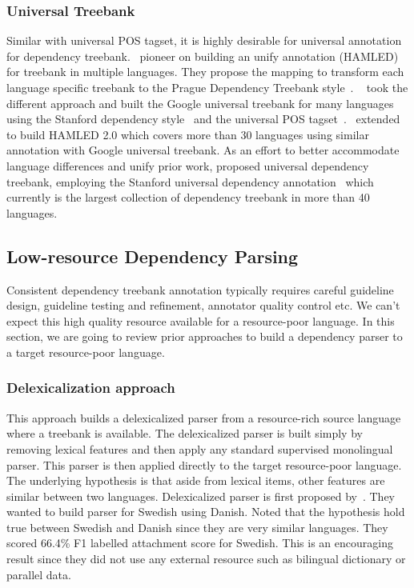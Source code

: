 \documentclass[12pt,twoside,final,hidelinks]{ltthesis}
\theoremstyle{definition}
\begin{document}
\subsubsection{Universal Treebank}
Similar with universal POS tagset, it is highly desirable for universal annotation for 
dependency treebank.~ pioneer on building an unify 
annotation (HAMLED) for treebank in multiple languages. They propose the mapping to transform 
each language specific treebank to the Prague Dependency Treebank 
style~\cite{bohmovahhh:2001}. 
~ took the different approach and built the Google 
universal treebank for many languages using the Stanford dependency 
style~\cite{deMarneffe:2008:STD:1608858.1608859} and the universal POS 
tagset~\cite{UniversalTagSet}.~ 
extended~ to build HAMLED 2.0 which covers more than 30 
languages using similar annotation with Google universal treebank. 
As an effort to better accommodate language differences and unify prior work, 
 proposed universal dependency treebank, employing the Stanford 
universal dependency annotation~\cite{DBLP:conf/lrec/MarneffeDSHGNM14} which currently is the 
largest collection of dependency treebank in more than 40 languages. 

\subsection{Low-resource Dependency Parsing}
\label{sec:crosslingualDepParsing}
Consistent dependency treebank annotation typically requires careful guideline design, guideline testing and refinement, annotator quality control etc. %
We can't expect this high quality resource available for a resource-poor language. In this section, we are going to review prior approaches to build a dependency parser to a target resource-poor language.
 
\subsubsection{Delexicalization approach}
This approach builds a delexicalized parser from a resource-rich source language where a treebank is available. The delexicalized parser is built simply by removing lexical features and then apply any standard supervised monolingual parser. This parser is then applied directly to the target resource-poor language. The underlying hypothesis is that aside from lexical items, other features are similar between two languages. 
Delexicalized parser is first proposed by~. They wanted to build parser for Swedish using Danish. Noted that the hypothesis hold true between Swedish and Danish since they are very similar languages.  They scored 66.4\% F1 labelled attachment score for Swedish. This is an encouraging result since they did not use any external resource such as bilingual dictionary or parallel data. 
\end{document}
